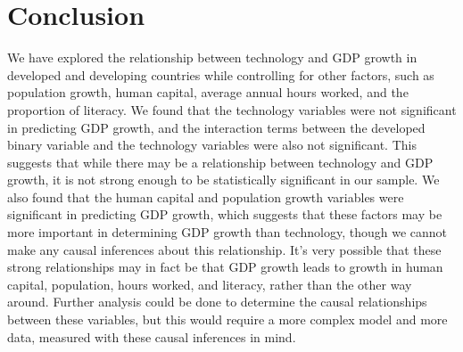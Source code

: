 \documentclass[11pt]{texMemo}
\begin{document}
\section{Conclusion}
We have explored the relationship between technology and GDP growth in developed and developing countries while controlling for other factors, such as population growth, human capital, average annual hours worked, and the proportion of literacy.
We found that the technology variables were not significant in predicting GDP growth, and the interaction terms between the developed binary variable and the technology variables were also not significant.
This suggests that while there may be a relationship between technology and GDP growth, it is not strong enough to be statistically significant in our sample.
We also found that the human capital and population growth variables were significant in predicting GDP growth, which suggests that these factors may be more important in determining GDP growth than technology, though we cannot make any causal inferences about this relationship.
It's very possible that these strong relationships may in fact be that GDP growth leads to growth in human capital, population, hours worked, and literacy, rather than the other way around.
Further analysis could be done to determine the causal relationships between these variables, but this would require a more complex model and more data, measured with these causal inferences in mind.
\end{document}
